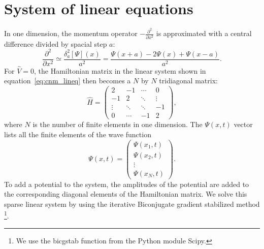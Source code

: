 
\section*{System of linear equations}
In one dimension, the momentum operator $-\frac{\partial^2}{\partial x^2}$ is approximated with a central difference divided by spacial step $a$:
\[
    \frac{\partial^2}{\partial x^2}
    \simeq \frac{\delta_a^2[\Psi](x)}{a^2} 
    = \frac{\Psi(x+a)-2\Psi(x)+\Psi(x-a)}{a^2}.
\]For $\hat{V}=0$, the Hamiltonian matrix in the linear system shown in equation~\ref{eq:cnm_lineq} then becomes a $N$ by $N$ tridiagonal matrix:
\[
\hat{H} =
 \begin{pmatrix}
    2       & -1     & \cdots & 0       \\
    -1      & 2      & \ddots & \vdots  \\
    \vdots  & \ddots & \ddots & -1      \\
    0       & \cdots & -1     & 2
 \end{pmatrix},
 \] where $N$ is the number of finite elements in one dimension. The $\Psi(x,t)$ vector lists all the finite elements of the wave function
 \[
\Psi(x,t) =
 \begin{pmatrix}
    \Psi(x_1,t)   \\
    \Psi(x_2,t)   \\
    \vdots      \\
    \Psi(x_N,t)
 \end{pmatrix}.
 \] To add a potential to the system, the amplitudes of the potential are added to the corresponding diagonal elements of the Hamiltonian matrix. We solve this sparse linear system by using the iterative Biconjugate gradient stabilized method \footnote{We use the bicgstab function from the Python module Scipy.}.
 
